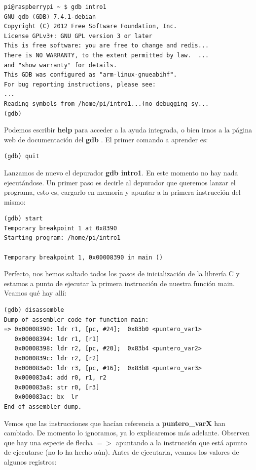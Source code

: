 \begin{lstlisting}
pi@raspberrypi ~ $ gdb intro1
GNU gdb (GDB) 7.4.1-debian
Copyright (C) 2012 Free Software Foundation, Inc.
License GPLv3+: GNU GPL version 3 or later 
This is free software: you are free to change and redis...
There is NO WARRANTY, to the extent permitted by law.  ...
and "show warranty" for details.
This GDB was configured as "arm-linux-gnueabihf".
For bug reporting instructions, please see:
...
Reading symbols from /home/pi/intro1...(no debugging sy...
(gdb)
\end{lstlisting}

Podemos escribir {\bf help} para acceder a la ayuda integrada, o bien
irnos a la página web de documentación del {\bf gdb} \cite{DGDB}.
El primer comando a aprender es:

\begin{lstlisting}
(gdb) quit
\end{lstlisting}

Lanzamos de nuevo el depurador {\bf gdb intro1}. En este momento no hay
nada ejecutándose. Un primer paso es decirle al depurador que queremos
lanzar el programa, esto es, cargarlo en memoria y apuntar a la primera
instrucción del mismo:

\begin{lstlisting}
(gdb) start
Temporary breakpoint 1 at 0x8390
Starting program: /home/pi/intro1
 
Temporary breakpoint 1, 0x00008390 in main ()
\end{lstlisting}

Perfecto, nos hemos saltado todos los pasos de inicialización de la
librería C y estamos a punto de ejecutar la primera instrucción de
nuestra función main. Veamos qué hay allí:

\begin{lstlisting}
(gdb) disassemble
Dump of assembler code for function main:
=> 0x00008390: ldr r1, [pc, #24];  0x83b0 <puntero_var1>
   0x00008394: ldr r1, [r1]
   0x00008398: ldr r2, [pc, #20];  0x83b4 <puntero_var2>
   0x0000839c: ldr r2, [r2]
   0x000083a0: ldr r3, [pc, #16];  0x83b8 <puntero_var3>
   0x000083a4: add r0, r1, r2
   0x000083a8: str r0, [r3]
   0x000083ac: bx  lr
End of assembler dump.
\end{lstlisting}

Vemos que las instrucciones que hacían referencia a {\bf puntero\_varX}
han cambiado. De momento lo ignoramos, ya lo explicaremos más adelante.
Observen que hay una especie de flecha {\bf $=>$} apuntando a la
instrucción que está apunto de ejecutarse (no lo ha hecho aún).
Antes de ejecutarla, veamos los valores de algunos registros:

